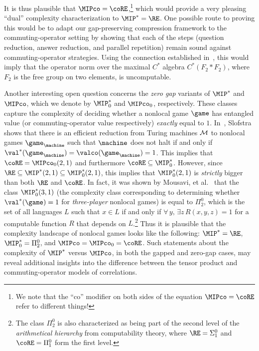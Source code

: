 It is thus plausible that $\MIPco = \coRE$,\footnote{We note that the ``co'' modifier on both sides of the equation $\MIPco = \coRE$ refer to different things!} which would provide a very pleasing ``dual'' complexity characterization to $\MIP^* = \RE$. One possible route to proving this would be to adapt our gap-preserving compression framework to the commuting-operator setting by showing that each of the steps (question reduction, answer reduction, and parallel repetition) remain sound against commuting-operator strategies. Using the connection established in~\cite{fritz2014can}, this would imply that the operator norm over the maximal $C^*$ algebra $C^*(F_2 * F_2)$, where $F_2$ is the free group on two elements, is uncomputable. 

Another interesting open question concerns the \emph{zero gap} variants of $\MIP^*$ and $\MIPco$, which we denote by $\MIP^*_0$ and $\MIPco_0$, respectively. These classes capture the complexity of deciding whether a nonlocal game $\game$ has entangled value (or commuting-operator value respectively) \emph{exactly} equal to $1$. In~\cite{slofstra2019set}, Slofstra shows that there is an efficient reduction from Turing machines $\cal{M}$ to nonlocal games $\game_\machine$ such that $\machine$ does not halt if and only if $\val^*(\game_\machine) = \valco(\game_\machine) = 1$. This implies that $\coRE = \MIPco_0(2,1)$ and furthermore $\coRE \subseteq \MIP^*_0$. However, since $\RE \subseteq \MIP^*(2,1) \subseteq \MIP^*_0(2,1)$, this implies that $\MIP^*_0(2,1)$ is \emph{strictly} bigger than both $\RE$ and $\coRE$. In fact, it was shown by Mousavi, et al.~\cite{mousavi2020complexity} that the class $\MIP^*_0(3,1)$ (the complexity class corresponding to determining whether $\val^*(\game) = 1$ for \emph{three-player} nonlocal games) is equal to $\Pi_2^0$, which is the set of all languages $L$ such that $x \in L$ if and only if $\forall\, y, \, \exists z \, R(x,y,z) = 1$ for a computable function $R$ that depends on $L$.\footnote{The class $\Pi_2^0$ is also characterized as being part of the second level of the \emph{arithmetical hierarchy} from computability theory, where $\RE = \Sigma_1^0$ and $\coRE = \Pi_1^0$ form the first level.} Thus it is plausible that the complexity landscape of nonlocal games looks like the following: $\MIP^* = \RE$, $\MIP^*_0 = \Pi_2^0$, and $\MIPco = \MIPco_0 = \coRE$. Such statements about the complexity of $\MIP^*$ versus $\MIPco$, in both the gapped and zero-gap cases, may reveal additional insights into the difference between the tensor product and commuting-operator models of correlations.




